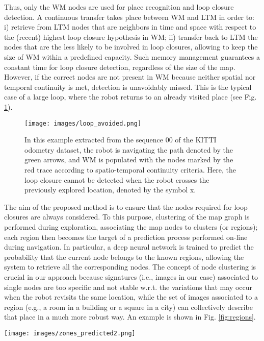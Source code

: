 \documentclass[letterpaper, 10 pt, conference]{ieeeconf}  %
\begin{document}
Thus, only the WM nodes are used for place recognition and loop closure detection. A continuous transfer takes place between WM and LTM in order to: i) retrieve from LTM nodes that are neighbors in time and space with respect to the (recent) highest loop closure hypothesis in WM; ii) transfer back to LTM the nodes that are the less likely to be involved in loop closures, allowing to keep the size of WM within a predefined capacity. Such memory management guarantees a constant time for loop closure detection, regardless of the size of the map. However, if the correct nodes are not present in WM because neither spatial nor temporal continuity is met, detection is unavoidably missed. This is the typical case of a large loop, where the robot returns to an already visited place (see Fig. \ref{fig:loop_avoided}). 



\begin{figure}[htbp]
    \centering
    \texttt{[image: images/loop\_avoided.png]}
    \caption{In this example extracted from the sequence 00 of the KITTI odometry dataset, the robot is navigating the path denoted by the green arrows, and WM is populated with the nodes marked by the red trace according to spatio-temporal continuity criteria. Here, the loop closure cannot be detected when the robot crosses the previously explored location, denoted by the symbol x.}
    \label{fig:loop_avoided}
\end{figure}

The aim of the proposed method is to ensure that the nodes required for loop closures are always considered. To this purpose, clustering of the map graph is performed during exploration, associating the map nodes to clusters (or regions); each region then becomes the target of a prediction process performed on-line during navigation. In particular, a deep neural network is trained to predict the probability that the current node belongs to the known regions, allowing the system to retrieve all the corresponding nodes. The concept of node clustering is crucial in our approach because signatures (i.e., images in our case) associated to single nodes are too specific and not stable w.r.t. the variations that may occur when the robot revisits the same location, while the set of images associated to a region (e.g., a room in a building or a square in a city) can collectively describe that place in a much more robust way. An example is shown in Fig. \ref{fig:regions}.


\begin{figure*}[htbp]
\centering
\texttt{[image: images/zones\_predicted2.png]}
\caption{The left image shows how the algorithm clusters the graph created by RTAB-Map run on sequence 09 of the KITTI odometry dataset. Each point in the image corresponds to a node in the graph and different clusters are colored differently. The image on the right highlights the regions predicted by the trained model in a subsequent navigation of the same sequence.}
\label{fig:regions}
\end{figure*} 
\end{document}
